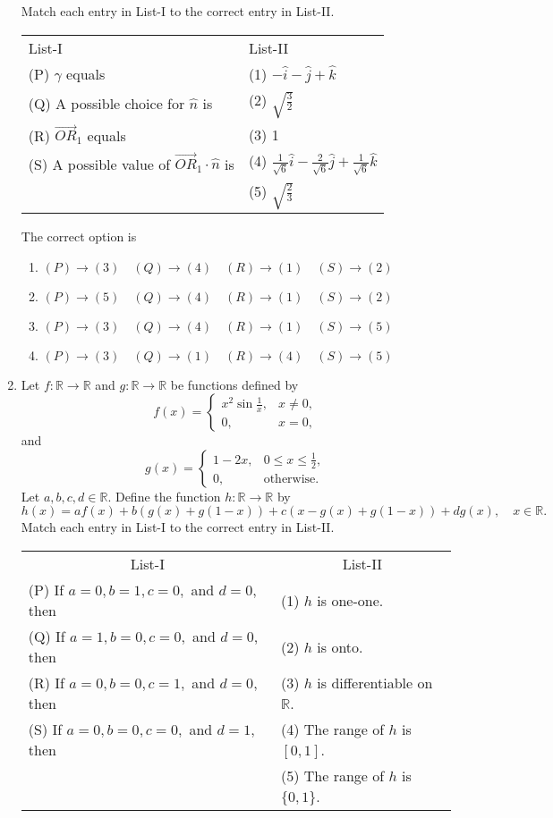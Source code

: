 \documentclass[12pt,a4paper]{article}
\begin{document}
\begin{enumerate}
Match each entry in List-I to the correct entry in List-II.

\begin{tabular}{ll}
List-I & List-II \\
(P) $\gamma$ equals & (1) $-\hat{i}-\hat{j}+\hat{k}$ \\
(Q) A possible choice for $\hat{n}$ is & (2) $\sqrt{\frac{3}{2}}$ \\
(R) $\vec{OR}_{1}$ equals & (3) 1 \\
(S) A possible value of $\vec{OR}_{1}\cdot\hat{n}$ is & (4) $\frac{1}{\sqrt{6}}\hat{i}-\frac{2}{\sqrt{6}}\hat{j}+\frac{1}{\sqrt{6}}\hat{k}$ \\
& (5) $\sqrt{\frac{2}{3}}$
\end{tabular}

The correct option is
\begin{enumerate}
    \item $ (P) \rightarrow (3) \quad (Q) \rightarrow (4) \quad (R) \rightarrow (1) \quad (S) \rightarrow (2) $
    \item $ (P) \rightarrow (5) \quad (Q) \rightarrow (4) \quad (R) \rightarrow (1) \quad (S) \rightarrow (2) $
    \item $ (P) \rightarrow (3) \quad (Q) \rightarrow (4) \quad (R) \rightarrow (1) \quad (S) \rightarrow (5) $
    \item $ (P) \rightarrow (3) \quad (Q) \rightarrow (1) \quad (R) \rightarrow (4) \quad (S) \rightarrow (5) $
\end{enumerate}

\item Let $f: \mathbb{R} \to \mathbb{R}$ and $g: \mathbb{R} \to \mathbb{R}$ be functions defined by
\[
f(x) =
\begin{cases} 
x^2 \sin \frac{1}{x}, & x \ne 0, \\
0, & x = 0,
\end{cases}
\]
and 
\[
g(x) = 
\begin{cases} 
1-2x, & 0 \le x \le \frac{1}{2}, \\
0, & \text{otherwise}.
\end{cases}
\]
Let $a, b, c, d \in \mathbb{R}$. Define the function $h: \mathbb{R} \to \mathbb{R}$ by
\[
h(x) = af(x) + b(g(x) + g(1-x)) + c(x - g(x) + g(1-x)) + d g(x), \quad x \in \mathbb{R}.
\]
Match each entry in List-I to the correct entry in List-II.

\begin{tabular}{ll}
\multicolumn{1}{c}{List-I} & \multicolumn{1}{c}{List-II} \\
(P) If $a=0, b=1, c=0,$ and $d=0$, then & (1) $h$ is one-one. \\
(Q) If $a=1, b=0, c=0,$ and $d=0$, then & (2) $h$ is onto. \\
(R) If $a=0, b=0, c=1,$ and $d=0$, then & (3) $h$ is differentiable on $\mathbb{R}$. \\
(S) If $a=0, b=0, c=0,$ and $d=1$, then & (4) The range of $h$ is $[0,1]$. \\
 & (5) The range of $h$ is $\{0,1\}$. 
\end{tabular}


\end{enumerate}
\end{document}
